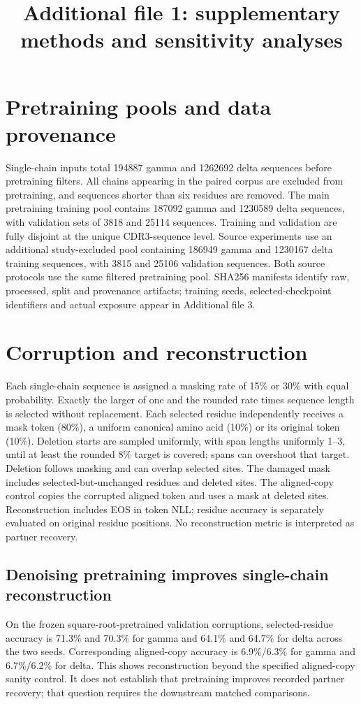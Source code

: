 \documentclass[a4paper,11pt]{article}
\title{Additional file 1: supplementary methods and sensitivity analyses}
\author{}
\date{}
\begin{document}
\maketitle
\section{Pretraining pools and data provenance}
Single-chain inputs total 194887 gamma and 1262692 delta sequences before
pretraining filters. All chains appearing in the paired corpus are excluded
from pretraining, and sequences shorter than six residues are removed. The main
pretraining training pool contains 187092 gamma and 1230589 delta sequences,
with validation sets of 3818 and 25114 sequences. Training and validation are
fully disjoint at the unique CDR3-sequence level. Source experiments
use an additional study-excluded pool containing 186949 gamma and 1230167
delta training sequences, with 3815 and 25106 validation sequences. Both source
protocols use the same filtered pretraining pool. SHA256 manifests identify raw, processed, split and provenance artifacts;
training seeds, selected-checkpoint identifiers and actual exposure appear in Additional file 3.


\section{Corruption and reconstruction}
Each single-chain sequence is assigned a masking rate of 15\% or 30\% with equal
probability. Exactly the larger of one and the rounded rate times sequence
length is selected without replacement. Each selected residue independently
receives a mask token (80\%), a uniform canonical amino acid (10\%) or its
original token (10\%). Deletion starts are sampled uniformly, with span lengths
uniformly 1--3, until at least the rounded 8\% target is covered; spans can
overshoot that target. Deletion follows masking and can overlap selected sites.
The damaged mask includes selected-but-unchanged residues and deleted sites.
The aligned-copy control copies the corrupted aligned token and uses a mask at
deleted sites. Reconstruction includes EOS in token NLL; residue accuracy is
separately evaluated on original residue positions. No reconstruction metric
is interpreted as partner recovery.


\subsection{Denoising pretraining improves single-chain reconstruction}
On the frozen square-root-pretrained validation corruptions, selected-residue
accuracy is 71.3\% and 70.3\% for gamma and 64.1\% and 64.7\% for delta across
the two seeds. Corresponding aligned-copy accuracy is 6.9\%/6.3\% for gamma and
6.7\%/6.2\% for delta. This shows reconstruction beyond the specified aligned-copy sanity control. It does not establish that pretraining improves recorded partner
recovery; that question requires the downstream matched comparisons.
\end{document}
